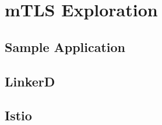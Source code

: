 %
%

\pagebreak
\section{mTLS Exploration}

\onehalfspacing

\subsection{Sample Application}

\subsection{LinkerD}

\subsection{Istio}

